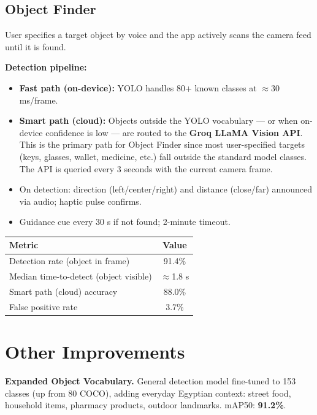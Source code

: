\documentclass[12pt, a4paper]{article}
\begin{document}
\subsection{Object Finder}

User specifies a target object by voice and the app actively scans the camera feed
until it is found.

\textbf{Detection pipeline:}
\begin{itemize}
  \item \textbf{Fast path (on-device):} YOLO handles 80+ known classes at $\approx$30 ms/frame.
  \item \textbf{Smart path (cloud):} Objects outside the YOLO vocabulary --- or when
        on-device confidence is low --- are routed to the \textbf{Groq LLaMA Vision API}.
        This is the primary path for Object Finder since most user-specified targets
        (keys, glasses, wallet, medicine, etc.) fall outside the standard model classes.
        The API is queried every 3 seconds with the current camera frame.
  \item On detection: direction (left/center/right) and distance (close/far) announced
        via audio; haptic pulse confirms.
  \item Guidance cue every 30 s if not found; 2-minute timeout.
\end{itemize}

\begin{center}
\begin{tabular}{lc}
\toprule
\textbf{Metric} & \textbf{Value} \\
\midrule
Detection rate (object in frame)        & 91.4\% \\
Median time-to-detect (object visible)  & $\approx$1.8 s \\
Smart path (cloud) accuracy             & 88.0\% \\
False positive rate                     & 3.7\%  \\
\bottomrule
\end{tabular}
\end{center}

\section{Other Improvements}

\textbf{Expanded Object Vocabulary.}
General detection model fine-tuned to 153 classes (up from 80 COCO), adding
everyday Egyptian context: street food, household items, pharmacy products,
outdoor landmarks. mAP50: \textbf{91.2\%}.
\end{document}
